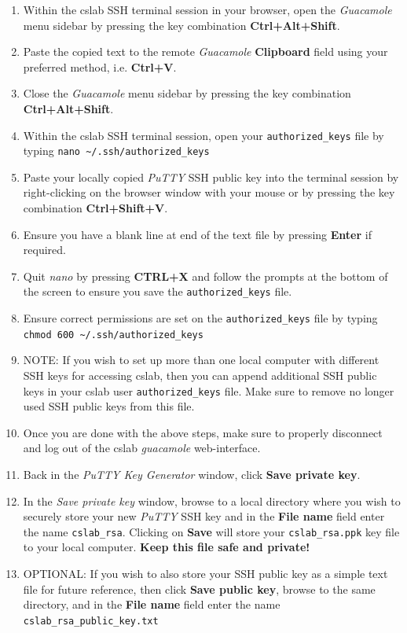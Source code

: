 \documentclass[12pt]{article}
\begin{document}
\begin{flushleft}
\begin{enumerate}
  \item Within the cslab SSH terminal session in your browser, open the \textit{Guacamole} menu sidebar by pressing the key combination \textbf{Ctrl+Alt+Shift}.
  \item Paste the copied text to the remote \textit{Guacamole} \textbf{Clipboard} field using your preferred method, i.e. \textbf{Ctrl+V}.
  \item Close the \textit{Guacamole} menu sidebar by pressing the key combination \textbf{Ctrl+Alt+Shift}.
  \item Within the cslab SSH terminal session, open your \verb|authorized_keys| file by typing \break
    \verb|nano ~/.ssh/authorized_keys|
  \item Paste your locally copied \textit{PuTTY} SSH public key into the terminal session by right-clicking on the browser window with your mouse or by pressing the key combination \textbf{Ctrl+Shift+V}.
  \item Ensure you have a blank line at end of the text file by pressing \textbf{Enter} if required.
  \item Quit \textit{nano} by pressing \textbf{CTRL+X} and follow the prompts at the bottom of the screen to ensure you save the \verb|authorized_keys| file.
  \item Ensure correct permissions are set on the \verb|authorized_keys| file by typing \break
    \verb|chmod 600 ~/.ssh/authorized_keys|
  \item NOTE: If you wish to set up more than one local computer with different SSH keys for accessing cslab, then you can append additional SSH public keys in your cslab user \verb|authorized_keys| file. Make sure to remove no longer used SSH public keys from this file.
  \item Once you are done with the above steps, make sure to properly disconnect and log out of the cslab \textit{guacamole} web-interface.
  \item Back in the \textit{PuTTY Key Generator} window, click \textbf{Save private key}.
  \item In the \textit{Save private key} window, browse to a local directory where you wish to securely store your new \textit{PuTTY} SSH key and in the \textbf{File name} field enter the name \verb|cslab_rsa|. Clicking on \textbf{Save} will store your \verb|cslab_rsa.ppk| key file to your local computer. \textbf{Keep this file safe and private!}
  \item OPTIONAL: If you wish to also store your SSH public key as a simple text file for future reference, then click \textbf{Save public key}, browse to the same directory, and in the \textbf{File name} field enter the name \verb|cslab_rsa_public_key.txt|

\end{enumerate}
\end{flushleft}
\end{document}
